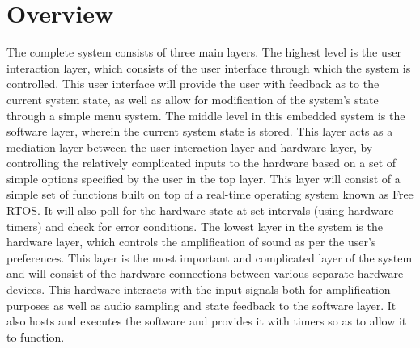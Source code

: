 \chapter{Overview}
The complete system consists of three main layers. The highest level is the user interaction layer, which consists of the user interface through which the system is controlled. This user interface will provide the user with feedback as to the current system state, as well as allow for modification of the system’s state through a simple menu system. The middle level in this embedded system is the software layer, wherein the current system state is stored. This layer acts as a mediation layer between the user interaction layer and hardware layer, by controlling the relatively complicated inputs to the hardware based on a set of simple options specified by the user in the top layer. This layer will consist of a simple set of functions built on top of a real-time operating system known as Free RTOS. It will also poll for the hardware state at set intervals (using hardware timers) and check for error conditions. The lowest layer in the system is the hardware layer, which controls the amplification of sound as per the user’s preferences. This layer is the most important and complicated layer of the system and will consist of the hardware connections between various separate hardware devices. This hardware interacts with the input signals both for amplification purposes as well as audio sampling and state feedback to the software layer. It also hosts and executes the software and provides it with timers so as to allow it to function.

